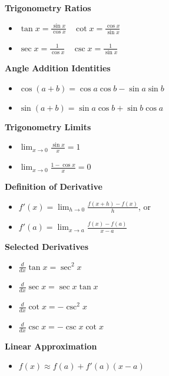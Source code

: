 \documentclass[12pt]{exam}
\newcommand{\ds}{\displaystyle}
\begin{document}
\noindent
\textbf{Trigonometry Ratios} ~
\begin{itemize}
\item $\ds \tan x = \frac{\sin x}{\cos x} ~~~~ \ds \cot x = \frac{\cos x}{\sin x}$
\bigskip

\item $\ds \sec x = \frac{1}{\cos x} ~~~~ \ds \csc x =  \frac{1}{\sin x}$
\bigskip
\end{itemize}

\noindent 
\textbf{Angle Addition Identities} ~
\begin{itemize}
\item $\cos(a+b) = \cos a \cos b - \sin a \sin b$
\bigskip

\item $\sin(a+b) = \sin a \cos b + \sin b \cos a$
\bigskip
\end{itemize}

\noindent
\textbf{Trigonometry Limits} ~
\begin{itemize}
\item $\ds \lim_{x \rightarrow 0} \frac{\sin x}{x} = 1$
\bigskip

\item $\ds \lim_{x \rightarrow 0} \frac{1-\cos x}{x} =0$
\bigskip
\end{itemize}

\noindent
\textbf{Definition of Derivative} ~
\begin{itemize}
\item $\ds f'(x) = \lim_{h\rightarrow 0} \frac{f(x+h)-f(x)}{h}$, or 
\bigskip

\item $\ds f'(a) = \lim_{x\rightarrow a} \frac{f(x)-f(a)}{x-a}$
\bigskip
\end{itemize}


\newpage

\noindent
\textbf{Selected Derivatives} ~ 
\begin{itemize}
\item $\ds \frac{d}{dx} \tan x = \sec^2 x $
\bigskip

\item $\ds \frac{d}{dx} \sec x = \sec x \tan x$
\bigskip

\item $\ds \frac{d}{dx} \cot x = -\csc^2 x $
\bigskip
\item $\ds \frac{d}{dx} \csc x = -\csc x \cot x$
\bigskip
\end{itemize}


\noindent
\textbf{Linear Approximation} ~
\begin{itemize}
\item $\ds f(x) \approx f(a) + f'(a)(x-a)$
\bigskip
\end{itemize}
\end{document}
